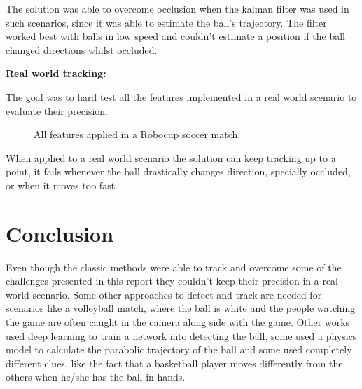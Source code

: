 \documentclass[10pt,twocolumn,letterpaper]{article}
\begin{document}
  The solution was able to overcome occlusion when the kalman filter was used in
  such scenarios, since it was able to estimate the ball's trajectory. The
  filter worked best with balls in low speed and couldn't estimate a position
  if the ball changed directions whilst occluded.

  \bigbreak{}
  \textbf{Real world tracking:}
  \bigbreak{}

  The goal was to hard test all the features implemented in a real world
  scenario to evaluate their precision.

  \begin{figure}[!h]
    \centering
    \setlength{\fboxsep}{1pt}
    \setlength{\fboxrule}{1pt}
    \caption{All features applied in a Robocup soccer match.}\label{fig:robocup_1}
  \end{figure}

  When applied to a real world scenario the solution can keep tracking up to a
  point, it fails whenever the ball drastically changes direction, specially
  occluded, or when it moves too fast.

  \section{Conclusion}\label{sec:conclusion}

  Even though the classic methods were able to track and overcome some of the
  challenges presented in this report they couldn't keep their precision in a real world
  scenario. Some other approaches to detect and track are needed for scenarios
  like a volleyball match, where the ball is white and the people watching the
  game are often caught in the camera along side with the game. Other works used deep
  learning to train a network into detecting the ball, some used a physics model
  to calculate the parabolic trajectory of the ball and some used completely
  different clues, like the fact that a basketball player moves differently from
  the others when he/she has the ball in hands.
\end{document}
